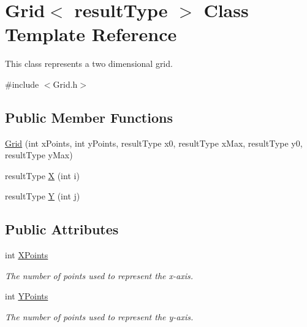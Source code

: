 \hypertarget{class_grid}{}\section{Grid$<$ result\+Type $>$ Class Template Reference}
\label{class_grid}


This class represents a two dimensional grid.  




{\ttfamily \#include $<$Grid.\+h$>$}

\subsection*{Public Member Functions}
\begin{DoxyCompactItemize}
\item 
\hyperlink{class_grid_a3f19f2be9f0547b305c5cac906a37b33}{Grid} (int x\+Points, int y\+Points, result\+Type x0, result\+Type x\+Max, result\+Type y0, result\+Type y\+Max)
\item 
result\+Type \hyperlink{class_grid_ad700ddfc8b14513dff9766b2d80d2f3f}{X} (int i)
\item 
result\+Type \hyperlink{class_grid_a65d9b614b67a2f8cbff493835cd7b42a}{Y} (int j)
\end{DoxyCompactItemize}
\subsection*{Public Attributes}
\begin{DoxyCompactItemize}
\item 
\hypertarget{class_grid_a5ecc47a87f79457507195a9ed01705ee}{}int \hyperlink{class_grid_a5ecc47a87f79457507195a9ed01705ee}{X\+Points}\label{class_grid_a5ecc47a87f79457507195a9ed01705ee}

\begin{DoxyCompactList}\small\item\em The number of points used to represent the x-\/axis. \end{DoxyCompactList}\item 
\hypertarget{class_grid_aa36f01c184bcaf78ca18b44df5855833}{}int \hyperlink{class_grid_aa36f01c184bcaf78ca18b44df5855833}{Y\+Points}\label{class_grid_aa36f01c184bcaf78ca18b44df5855833}

\begin{DoxyCompactList}\small\item\em The number of points used to represent the y-\/axis. \end{DoxyCompactList}\end{DoxyCompactItemize}


